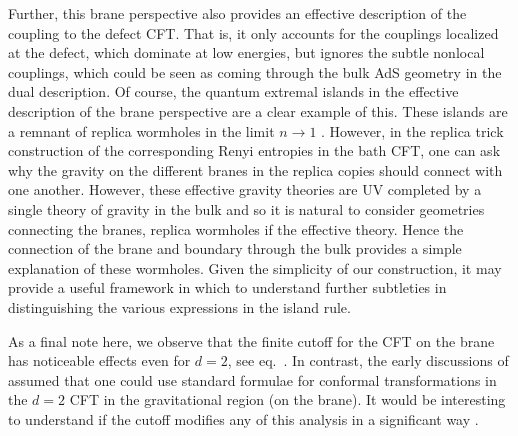 Further, this brane perspective also provides an effective description of the coupling to the defect CFT. That is, it only accounts for the couplings localized at the defect, which dominate at low energies, but ignores the subtle nonlocal couplings, which could be seen as coming through the bulk AdS geometry in the dual description. Of course, the quantum extremal islands in the effective description of the brane perspective are a clear example of this. These islands are a remnant of replica wormholes in the limit $n\to1$ \cite{Penington:2019kki,Hartman:2020swn}. However, in the replica trick construction of the corresponding Renyi entropies in the bath CFT, one can ask why the gravity on the different branes in the replica copies should connect with one another. However, these effective gravity theories are UV completed by a single theory of gravity in the bulk and so it is natural to consider geometries connecting the branes, \ie replica wormholes if the effective theory. Hence the connection of the brane and boundary through the bulk provides a simple explanation of these wormholes.  Given the simplicity of our construction, it may provide a useful framework in which to understand further subtleties in distinguishing the various expressions in the island rule.

As a final note here, we observe that the finite cutoff for the CFT on the brane has noticeable effects even for $d=2$, \eg see eq.~. In contrast, the early discussions of \eg \cite{Almheiri:2019hni,Almheiri:2019psf, Almheiri:2019yqk, Chen:2019uhq, Penington:2019kki, Almheiri:2019qdq} assumed that one could use standard formulae for conformal transformations in the $d=2$ CFT in the gravitational region (\ie on the brane). It would be interesting to understand if the cutoff modifies any of this analysis in a significant way \cite{QEI}.\\

